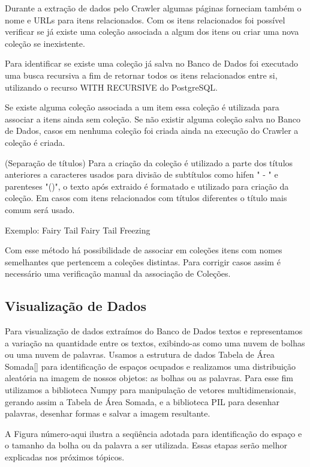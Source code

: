 \documentclass[12pt]{article}
\begin{document}
Durante a extração de dados pelo Crawler algumas páginas forneciam também o nome e URLs para itens relacionados. Com os itens relacionados foi possível verificar se já existe uma coleção associada a algum dos itens ou criar uma nova coleção se inexistente.

Para identificar se existe uma coleção já salva no Banco de Dados foi executado uma busca recursiva a fim de retornar todos os itens relacionados entre si, utilizando o recurso WITH RECURSIVE do PostgreSQL.

Se existe alguma coleção associada a um item essa coleção é utilizada para associar a itens ainda sem coleção. Se não existir alguma coleção salva no Banco de Dados, casos em nenhuma coleção foi criada ainda na execução do Crawler a coleção é criada.

(Separação de títulos)
Para a criação da coleção é utilizado a parte dos títulos anteriores a caracteres usados para divisão de subtítulos como hifen " - " e parenteses "()", o texto após extraido é formatado e utilizado para criação da coleção. 
Em casos com itens relacionados com títulos diferentes o título mais comum será usado.  


Exemplo:
		Fairy Tail
		Fairy Tail Freezing

		

Com esse método há possibilidade de associar em coleções itens com nomes semelhantes que pertencem a coleções distintas. Para corrigir casos assim é necessário uma verificação manual da associação de Coleções.



\subsection{Visualização de Dados}

Para visualização de dados extraímos do Banco de Dados textos e representamos a variação na quantidade entre os textos, exibindo-as como uma nuvem de bolhas ou uma nuvem de palavras. 
Usamos a estrutura de dados Tabela de Área Somada[] para identificação de espaços ocupados e realizamos uma distribuição aleatória na imagem de nossos objetos: as bolhas ou as palavras.
Para esse fim utilizamos a biblioteca Numpy para manipulação de vetores multidimensionais, gerando assim a Tabela de Área Somada, e a biblioteca PIL para desenhar palavras, desenhar formas e salvar a imagem resultante.

A Figura número-aqui ilustra a seqüência adotada para identificação do espaço e o tamanho da bolha ou da palavra a ser utilizada. Essas etapas serão melhor explicadas nos próximos tópicos.   
\end{document}
